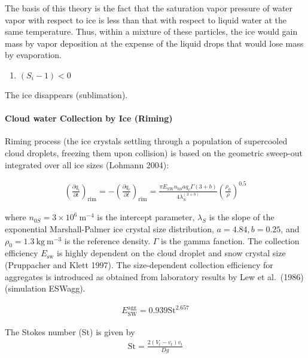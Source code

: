 The basis of this theory is the fact that the saturation vapor pressure
of water vapor with respect to ice is less than that with respect to
liquid water at the same temperature. Thus, within a mixture of these
particles, the ice would gain mass by vapor deposition at the expense of
the liquid drops that would lose mass by evaporation.

\begin{enumerate}
\def\labelenumi{\arabic{enumi}.}
\setcounter{enumi}{1}
\tightlist
\item
  \((S_i - 1)<0\)
\end{enumerate}

The ice disappears (sublimation).

\hypertarget{cloud-water-collection-by-ice-riming}{%
\paragraph{Cloud water Collection by Ice
(Riming)}\label{cloud-water-collection-by-ice-riming}}

Riming process (the ice crystals settling through a population of
supercooled cloud droplets, freezing them upon collision) is based on
the geometric sweep-out integrated over all ice sizes (Lohmann 2004):

\begin{eqnarray}
\left(\frac{\partial q_i}{\partial t}\right)_{\text {rim}}
=-\left(\frac{\partial q_c}{\partial t}\right)_{\text {rim}}
=\frac{\pi E_{\mathrm{SW}} n_{0S} a q_{c} \Gamma(3+b)}{4 \lambda_{S}^{(3+b)}}\left(\frac{\rho_{0}}{\rho}\right)^{0.5}
\end{eqnarray}

where \(n_{0 S}=3 \times 10^{6} \mathrm{~m}^{-4}\) is the intercept
parameter, \(\lambda_{S}\) is the slope of the exponential
Marshall-Palmer ice crystal size distribution, \(a=4.84, b=0.25\), and
\(\rho_{0}=1.3 \mathrm{~kg} \mathrm{~m}^{-3}\) is the reference density.
\(\Gamma\) is the gamma fanction. The collection efficiency
\(E_{\mathrm{sw}}\) is highly dependent on the cloud droplet and snow
crystal size (Pruppacher and Klett 1997). The size-dependent collection
efficiency for aggregates is introduced as obtained from laboratory
results by Lew et al.~(1986) (simulation ESWagg).

\begin{eqnarray}
E_{\mathrm{SW}}^{\mathrm{agg}}=0.939 \mathrm{St}^{2.657}
\end{eqnarray}

The Stokes number (St) is given by \begin{eqnarray}
\mathrm{St}=\frac{2\left(V_{t}-{v}_{t}\right) {v}_{t}}{D g}
\end{eqnarray}

